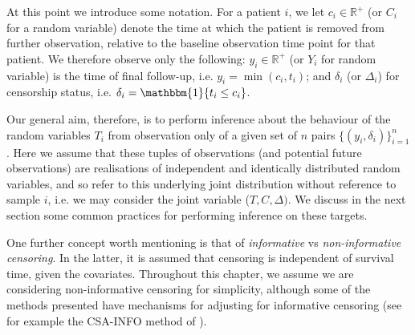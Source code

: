 \documentclass[../thesis.tex]{subfiles}
\begin{document}
At this point we introduce some notation. For a patient $i$, we let $c_i \in \mathbb{R}^{+}$ (or $C_i$ for a random variable) denote the time at which the patient is removed from further observation, relative to the baseline observation time point for that patient. We therefore observe only the following: $y_i \in \mathbb{R}^{+}$ (or $Y_i$ for random variable) is the time of final follow-up, i.e. $y_i = \min(c_i, t_i)$; and $\delta_i$ (or $\Delta_i$) for censorship status, i.e. $\delta_i = \mathbbm{1}\{t_i \leq c_i\}$. 

Our general aim, therefore, is to perform inference about the behaviour of the random variables $T_i$ from observation only of a given set of $n$ pairs $\{(y_i, \delta_i)\}_{i=1}^{n}$. Here we assume that these tuples of observations (and potential future observations) are realisations of independent and identically distributed random variables, and so refer to this underlying joint distribution without reference to sample $i$, i.e. we may consider the joint variable ($T, C, \Delta)$.  We discuss in the next section some common practices for performing inference on these targets.

One further concept worth mentioning is that of \emph{informative} vs \emph{non-informative censoring}. In the latter, it is assumed that censoring is independent of survival time, given the covariates. Throughout this chapter, we assume we are considering non-informative censoring for simplicity, although some of the methods presented have mechanisms for adjusting for informative censoring (see for example the CSA-INFO method of \citealp{chapfuwa_enabling_2021}).
   
\end{document}

